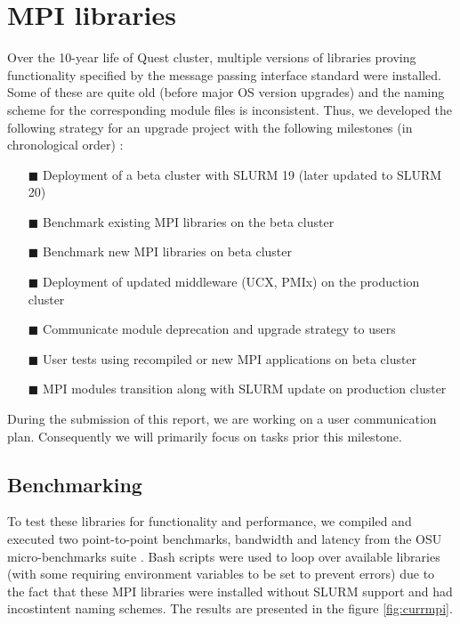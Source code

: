 \documentclass[manuscript,screen]{acmart}
\begin{document}
\section{MPI libraries}
Over the 10-year life of Quest cluster, multiple versions of libraries proving functionality specified by the message passing interface standard \cite{mpi_3_1,mpi_2_2} were installed. Some of these are quite old (before major OS version upgrades) and the naming scheme for the corresponding module files is inconsistent. Thus, we developed the following strategy for an upgrade project
with the following milestones (in chronological order) :
\begin{itemize}
	\item[$\blacksquare$] Deployment of a beta cluster with SLURM 19 (later updated to SLURM 20)
	\item[$\blacksquare$] Benchmark existing MPI libraries on the beta cluster
	\item[$\blacksquare$] Benchmark new MPI libraries on beta cluster
	\item[$\blacksquare$] Deployment of updated middleware (UCX, PMIx) on the production cluster
	\item[$\blacksquare$] Communicate module deprecation and upgrade strategy to users
	\item[$\blacksquare$] User tests using recompiled or new MPI applications on beta cluster
	\item[$\blacksquare$] MPI modules transition along with SLURM update on production cluster
\end{itemize}

During the submission of this report, we are working on a user communication plan. Consequently we will primarily focus on tasks prior this milestone.

\subsection{Benchmarking}

To test these libraries for functionality and performance, we compiled and executed two point-to-point benchmarks, bandwidth and latency from the OSU micro-benchmarks suite \cite{osu_bench_website}. Bash scripts were used to loop over available libraries (with some requiring environment variables to be set to prevent errors) due to the fact that these MPI libraries were installed without SLURM support and had incostintent naming schemes. The results are presented in the figure \ref{fig:currmpi}.
\end{document}
